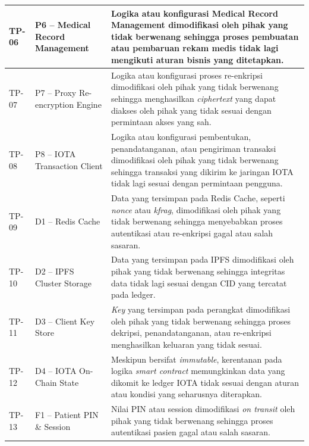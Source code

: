 \begin{xltabular}{\textwidth}{|>{\centering\arraybackslash}p{1.8cm}|>{\raggedright\arraybackslash}p{3.2cm}|X|}
    TP-06 &
    P6 -- Medical Record Management &
    Logika atau konfigurasi Medical Record Management dimodifikasi oleh pihak yang tidak berwenang sehingga proses pembuatan atau pembaruan rekam medis tidak lagi mengikuti aturan bisnis yang ditetapkan. \\
    \hline

    TP-07 &
    P7 -- Proxy Re-encryption Engine &
    Logika atau konfigurasi proses re-enkripsi dimodifikasi oleh pihak yang tidak berwenang sehingga menghasilkan \textit{ciphertext} yang dapat diakses oleh pihak yang tidak sesuai dengan permintaan akses yang sah. \\
    \hline

    TP-08 &
    P8 -- IOTA Transaction Client &
    Logika atau konfigurasi pembentukan, penandatanganan, atau pengiriman transaksi dimodifikasi oleh pihak yang tidak berwenang sehingga transaksi yang dikirim ke jaringan IOTA tidak lagi sesuai dengan permintaan pengguna. \\
    \hline

    TP-09 &
    D1 -- Redis Cache &
    Data yang tersimpan pada Redis Cache, seperti \textit{nonce} atau \textit{kfrag}, dimodifikasi oleh pihak yang tidak berwenang sehingga menyebabkan proses autentikasi atau re-enkripsi gagal atau salah sasaran. \\
    \hline

    TP-10 &
    D2 -- IPFS Cluster Storage &
    Data yang tersimpan pada IPFS dimodifikasi oleh pihak yang tidak berwenang sehingga integritas data tidak lagi sesuai dengan CID yang tercatat pada ledger. \\
    \hline

    TP-11 &
    D3 -- Client Key Store &
    \textit{Key} yang tersimpan pada perangkat dimodifikasi oleh pihak yang tidak berwenang sehingga proses dekripsi, penandatanganan, atau re-enkripsi menghasilkan keluaran yang tidak sesuai. \\
    \hline

    TP-12 &
    D4 -- IOTA On-Chain State &
    Meskipun bersifat \textit{immutable}, kerentanan pada logika \textit{smart contract} memungkinkan data yang dikomit ke ledger IOTA tidak sesuai dengan aturan atau kondisi yang seharusnya diterapkan. \\
    \hline

    TP-13 &
    F1 -- Patient PIN \& Session &
    Nilai PIN atau session dimodifikasi \textit{on transit} oleh pihak yang tidak berwenang sehingga proses autentikasi pasien gagal atau salah sasaran. \\
    \hline


\end{xltabular}
